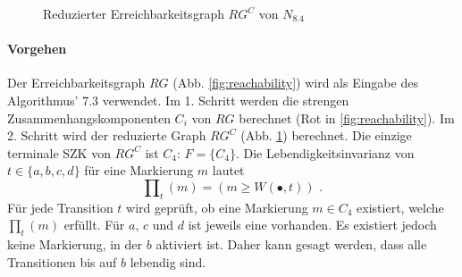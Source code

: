 \documentclass[a4paper]{scrartcl}
\begin{document}
\begin{figure}[h]
    \centering
    \caption{Reduzierter Erreichbarkeitsgraph $RG^C$ von $N_{8.4}$}
    \label{fig:rgc}
\end{figure}

\paragraph{Vorgehen}
Der Erreichbarkeitsgraph $RG$ (Abb. \ref{fig:reachability}) wird als Eingabe
des Algorithmus' 7.3 verwendet.
Im 1. Schritt werden die strengen Zusammenhangskomponenten $C_i$ von $RG$
berechnet (Rot in \ref{fig:reachability}).
Im 2. Schritt wird der reduzierte Graph $RG^C$ (Abb. \ref{fig:rgc}) berechnet.
Die einzige terminale SZK von $RG^C$ ist $C_4$: $F = \{ C_4 \}$.
Die Lebendigkeitsinvarianz von $t \in \{ a,b,c,d \}$ für eine Markierung $m$
lautet
\begin{equation}
    \prod\nolimits_t (m) = (m \geq W(\bullet,t)) \text{ .}
\end{equation}
Für jede Transition $t$ wird geprüft, ob eine Markierung $m \in C_4$ existiert,
welche $\prod\nolimits_t(m)$ erfüllt.
Für $a$, $c$ und $d$ ist jeweils eine vorhanden.
Es existiert jedoch keine Markierung, in der $b$ aktiviert ist.
Daher kann gesagt werden, dass alle Transitionen bis auf $b$ lebendig sind.
\end{document}
